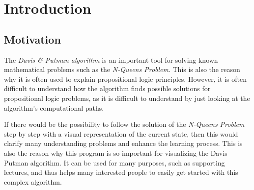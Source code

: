 
\chapter{Introduction}
\label{ch:introduction}

\section{Motivation}
\label{sec:introMotivation}
The \textit{Davis \& Putman algorithm} is an important tool for solving known mathematical problems such as the \textit{N-Queens Problem}. This is also the reason why it is often used to explain propositional logic principles. However, it is often difficult to understand how the algorithm finds possible solutions for propositional logic problems, as it is difficult to understand by just looking at the algorithm's computational paths.

If there would be the possibility to follow the solution of the \textit{N-Queens Problem} step by step with a visual representation of the current state, then this would clarify many understanding problems and enhance the learning process. This is also the reason why this program is so important for visualizing the Davis Putman algorithm. It can be used for many purposes, such as supporting lectures, and thus helps many interested people to easily get started with this complex algorithm.

